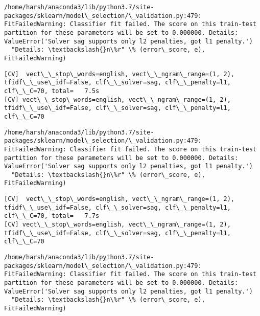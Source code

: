 \documentclass[11pt]{article}
\begin{document}
    \begin{Verbatim}[commandchars=\\\{\}]
/home/harsh/anaconda3/lib/python3.7/site-packages/sklearn/model\_selection/\_validation.py:479: FitFailedWarning: Classifier fit failed. The score on this train-test partition for these parameters will be set to 0.000000. Details: 
ValueError('Solver sag supports only l2 penalties, got l1 penalty.')
  "Details: \textbackslash{}n\%r" \% (error\_score, e), FitFailedWarning)

    \end{Verbatim}

    \begin{Verbatim}[commandchars=\\\{\}]
[CV]  vect\_\_stop\_words=english, vect\_\_ngram\_range=(1, 2), tfidf\_\_use\_idf=False, clf\_\_solver=sag, clf\_\_penalty=l1, clf\_\_C=70, total=   7.5s
[CV] vect\_\_stop\_words=english, vect\_\_ngram\_range=(1, 2), tfidf\_\_use\_idf=False, clf\_\_solver=sag, clf\_\_penalty=l1, clf\_\_C=70 

    \end{Verbatim}

    \begin{Verbatim}[commandchars=\\\{\}]
/home/harsh/anaconda3/lib/python3.7/site-packages/sklearn/model\_selection/\_validation.py:479: FitFailedWarning: Classifier fit failed. The score on this train-test partition for these parameters will be set to 0.000000. Details: 
ValueError('Solver sag supports only l2 penalties, got l1 penalty.')
  "Details: \textbackslash{}n\%r" \% (error\_score, e), FitFailedWarning)

    \end{Verbatim}

    \begin{Verbatim}[commandchars=\\\{\}]
[CV]  vect\_\_stop\_words=english, vect\_\_ngram\_range=(1, 2), tfidf\_\_use\_idf=False, clf\_\_solver=sag, clf\_\_penalty=l1, clf\_\_C=70, total=   7.7s
[CV] vect\_\_stop\_words=english, vect\_\_ngram\_range=(1, 2), tfidf\_\_use\_idf=False, clf\_\_solver=sag, clf\_\_penalty=l1, clf\_\_C=70 

    \end{Verbatim}

    \begin{Verbatim}[commandchars=\\\{\}]
/home/harsh/anaconda3/lib/python3.7/site-packages/sklearn/model\_selection/\_validation.py:479: FitFailedWarning: Classifier fit failed. The score on this train-test partition for these parameters will be set to 0.000000. Details: 
ValueError('Solver sag supports only l2 penalties, got l1 penalty.')
  "Details: \textbackslash{}n\%r" \% (error\_score, e), FitFailedWarning)

    \end{Verbatim}
\end{document}
